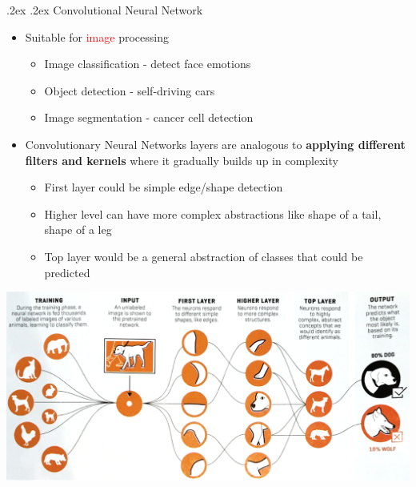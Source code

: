 \documentclass[landscape,a4paper]{article}
\makeatletter
\renewcommand{\subsection}{\@startsection{subsection}{1}{0mm}%
	{.2ex}%
	{.2ex}%
	{\sffamily\bfseries}}
\makeatother
\begin{document}
\begin{multicols*}{4}
	\subsection{Convolutional Neural Network}
	\begin{itemize}
		\item Suitable for \textcolor{red}{image} processing
		\begin{itemize}
			\item Image classification - detect face emotions
			\item Object detection - self-driving cars
			\item Image segmentation - cancer cell detection
		\end{itemize}
		\item Convolutionary Neural Networks layers are analogous to \textbf{applying different filters and kernels} where it gradually builds up in complexity
		\begin{itemize}
			\item First layer could be simple edge/shape detection
			\item Higher level can have more complex abstractions like shape of a tail, shape of a leg
			\item Top layer would be a general abstraction of classes that could be predicted
		\end{itemize}
	\end{itemize}
	\begin{center}
		\includegraphics[width=0.6\columnwidth]{cnn}
	\end{center}

\end{multicols*}
\end{document}
